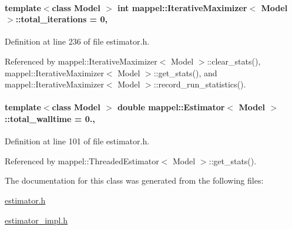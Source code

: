 \paragraph[{\texorpdfstring{total\+\_\+iterations}{total_iterations}}]{\setlength{\rightskip}{0pt plus 5cm}template$<$class Model $>$ int {\bf mappel\+::\+Iterative\+Maximizer}$<$ Model $>$\+::total\+\_\+iterations = 0\hspace{0.3cm}{\ttfamily [protected]}, {\ttfamily [inherited]}}\hypertarget{classmappel_1_1IterativeMaximizer_a8d344b09841e61cc726dc430d8451044}{}\label{classmappel_1_1IterativeMaximizer_a8d344b09841e61cc726dc430d8451044}


Definition at line 236 of file estimator.\+h.



Referenced by mappel\+::\+Iterative\+Maximizer$<$ Model $>$\+::clear\+\_\+stats(), mappel\+::\+Iterative\+Maximizer$<$ Model $>$\+::get\+\_\+stats(), and mappel\+::\+Iterative\+Maximizer$<$ Model $>$\+::record\+\_\+run\+\_\+statistics().

\paragraph[{\texorpdfstring{total\+\_\+walltime}{total_walltime}}]{\setlength{\rightskip}{0pt plus 5cm}template$<$class Model $>$ double {\bf mappel\+::\+Estimator}$<$ Model $>$\+::total\+\_\+walltime = 0.\hspace{0.3cm}{\ttfamily [protected]}, {\ttfamily [inherited]}}\hypertarget{classmappel_1_1Estimator_a5a408458a111c5222193871fa6bb6644}{}\label{classmappel_1_1Estimator_a5a408458a111c5222193871fa6bb6644}


Definition at line 101 of file estimator.\+h.



Referenced by mappel\+::\+Threaded\+Estimator$<$ Model $>$\+::get\+\_\+stats().



The documentation for this class was generated from the following files\+:\begin{DoxyCompactItemize}
\item 
\hyperlink{estimator_8h}{estimator.\+h}\item 
\hyperlink{estimator__impl_8h}{estimator\+\_\+impl.\+h}\end{DoxyCompactItemize}
